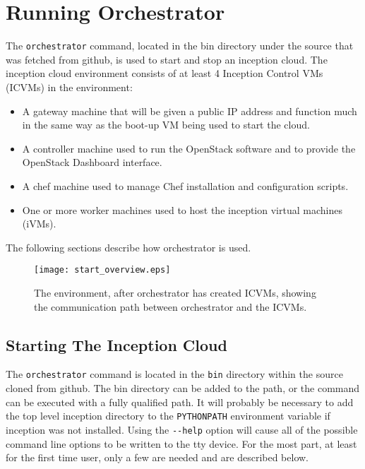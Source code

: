 \section{Running Orchestrator}
The \verb!orchestrator! command, located in the bin directory under the source that was fetched from github, 
is used to start and stop an inception cloud. 
The inception cloud environment consists of at least 4 Inception Control VMs (ICVMs)  in the environment:

\begin{itemize}
\item A gateway machine that will be given a public IP address and function much in the same way as the 
boot-up VM being used to start the cloud. 

\item A controller machine used to run the OpenStack software and to provide the OpenStack Dashboard interface. 

\item A chef machine used to manage Chef installation and configuration scripts. 

\item One or more worker machines used to host the inception virtual machines (iVMs). 
\end{itemize}

\noindent
The following sections describe how orchestrator is used. 

\begin{figure}
  \centering
  \texttt{[image: start\_overview.eps]}
  \tiny
  \caption{\small The environment, after orchestrator has created ICVMs, showing the communication path between orchestrator and the ICVMs.
    \label{fg_overview} \normalsize
  }
  \normalsize
\end{figure}

\subsection{Starting The Inception Cloud}
The \verb!orchestrator! command is located in the \verb!bin! directory within the source cloned from github. 
The bin directory can be added to the path, or the command can be executed with a fully qualified path.  
It will probably be necessary to add the top level inception directory to the \verb!PYTHONPATH! environment variable
if inception was not installed. 
Using the \verb!--help! option will cause all of the possible command line options to be written to the tty device. 
For the most part, at least for the first time user, only a few are needed and are described below. 

